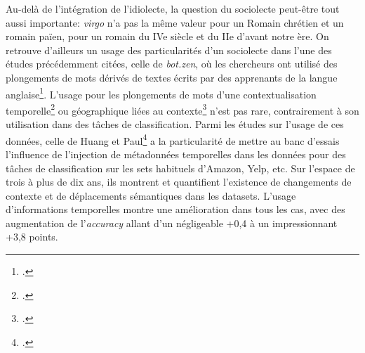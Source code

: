 Au-delà de l'intégration de l'idiolecte, la question du sociolecte peut-être tout aussi importante: \textit{virgo} n'a pas la même valeur pour un Romain chrétien et un romain païen, pour un romain du IVe siècle et du IIe d'avant notre ère. On retrouve d'ailleurs un usage des particularités d'un sociolecte dans l'une des études précédemment citées, celle de \textit{bot.zen}, où les chercheurs ont utilisé des plongements de mots dérivés de textes écrits par des apprenants de la langue anglaise\footcite{stemle_using_2018}. L'usage pour les plongements de mots d'une contextualisation temporelle\footcite{carlo_training_2019} ou géographique liées au contexte\footcite{gong_enriching_2020} n'est pas rare, contrairement à son utilisation dans des tâches de classification. Parmi les études sur l'usage de ces données, celle de Huang et Paul\footcite{huang_neural_2019} a la particularité de mettre au banc d'essais l'influence de l'injection de métadonnées temporelles dans les données pour des tâches de classification sur les sets habituels d'Amazon, Yelp, etc. Sur l'espace de trois à plus de dix ans, ils montrent et quantifient l'existence de changements de contexte et de déplacements sémantiques dans les datasets. L'usage d'informations temporelles montre une amélioration dans tous les cas, avec des augmentation de l'\textit{accuracy} allant d'un négligeable +0,4 à un impressionnant +3,8 points.

